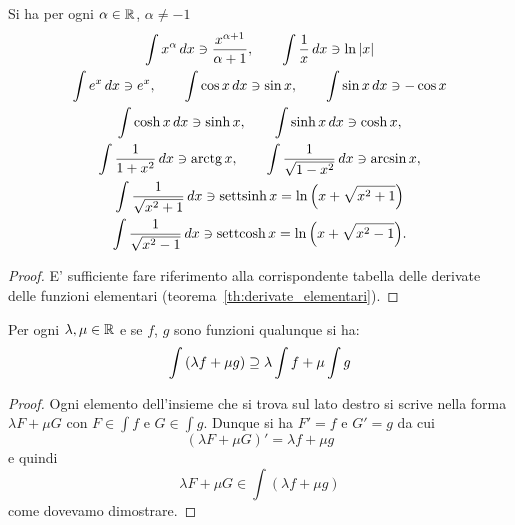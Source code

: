 \begin{theorem}
Si ha
per ogni $\alpha \in {\mathbb R}$, $\alpha\neq -1$
\begin{gather*}
\int x^\alpha\, dx \ni \frac{x^{\alpha+1}}{\alpha+1},
\qquad
\int \frac{1}{x}\, dx \ni \ln{\left|x\right|}
\\
\int e^x \, dx \ni e^x,
\qquad
\int \cos x\, dx \ni \sin x,
\qquad
\int \sin x\, dx \ni -\cos x
\\
\int \cosh x \, dx \ni \sinh x,\qquad
\int \sinh x \, dx \ni \cosh x, \\
\int \frac{1}{1+x^2}\, dx \ni \operatorname{arctg} x, \qquad
\int \frac{1}{\sqrt{1-x^2}}\, dx \ni \arcsin x, \\
\int \frac{1}{\sqrt{x^2+1}}\, dx \ni \operatorname{settsinh} x = \ln{\left( x+\sqrt{x^2+1} \right)}\\
\int \frac{1}{\sqrt{x^2-1}}\, dx \ni \operatorname{settcosh} x = \ln{\left( x+\sqrt{x^2-1} \right)}.
\end{gather*}
\end{theorem}
%
\begin{proof}
E' sufficiente fare riferimento alla corrispondente tabella
delle derivate delle funzioni elementari (teorema~\ref{th:derivate_elementari}).
\end{proof}

\begin{theorem}
Per ogni $\lambda,\mu \in {\mathbb R}$ e se $f$, $g$ sono funzioni qualunque si ha:
\[
  \int {\left( \lambda f + \mu g \right)} \supseteq \lambda \int f + \mu \int g
\]
\end{theorem}
%
\begin{proof}
Ogni elemento dell'insieme che si trova sul lato destro
si scrive nella forma $\lambda F + \mu G$ con $F\in \int f$ e $G\in \int g$.
Dunque si ha $F'=f$ e $G'=g$ da cui
\[
  (\lambda F + \mu G)' = \lambda f + \mu g
\]
e quindi
\[
  \lambda F + \mu G \in \int (\lambda f + \mu g)
\]
come dovevamo dimostrare.
\end{proof}


